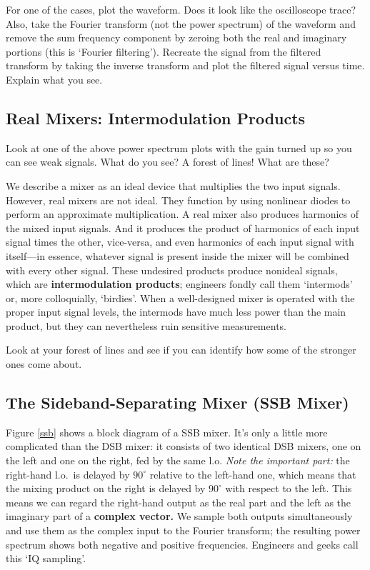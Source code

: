\documentclass[12pt,preprint]{aastex}
\begin{document}
For one of the cases, plot the waveform.  Does it look like the
oscilloscope trace? Also, take the Fourier transform (not the power
spectrum) of the waveform and remove the sum frequency component by
zeroing both the real and imaginary portions (this is `Fourier
filtering').  Recreate the signal from the filtered transform by taking
the inverse transform and plot the filtered signal versus time.  Explain
what you see.

\subsection{Real Mixers: Intermodulation Products}

Look at one of the above power spectrum plots with the gain turned up so
you can see weak signals. What do you see? A forest of lines! What are
these?

We describe a mixer as an ideal device that multiplies the two input
signals. However, real mixers are not ideal. They function by using
nonlinear diodes to perform an approximate multiplication. A real mixer
also produces harmonics of the mixed input signals. And it produces
the product of harmonics of each input signal times the other,
vice-versa, and even harmonics of each input signal with itself---in
essence, whatever signal is present inside the mixer will be combined
with every other signal. These undesired products produce nonideal
signals, which are {\bf intermodulation products}; engineers fondly call
them `intermods' or, more colloquially, `birdies'. When a well-designed
mixer is operated with the proper input signal levels, the intermods
have much less power than the main product, but they can nevertheless
ruin sensitive measurements.

Look at your forest of lines and see if you can identify how some of the
stronger ones come about.

\subsection{ The Sideband-Separating Mixer (SSB Mixer)}
\label{sectssb}

Figure \ref{ssb} shows a block diagram of a SSB mixer. It's only a
little more complicated than the DSB mixer: it consists of two identical
DSB mixers, one on the left and one on the right, fed by the same
l.o. {\it Note the important part:} the right-hand l.o.\ is delayed by
$90 ^\circ$ relative to the left-hand one, which means that the mixing
product on the right is delayed by $90^\circ$ with respect to the
left. This means we can regard the right-hand output as the real part
and the left as the imaginary part of a {\bf complex vector.} We sample
both outputs simultaneously and use them as the complex input to the
Fourier transform; the resulting power spectrum shows both negative and
positive frequencies. Engineers and geeks call this `IQ sampling'.
\end{document}
